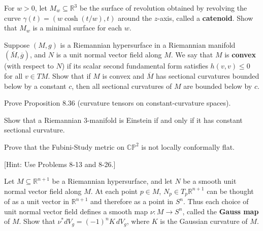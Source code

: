 \begin{exercise}
\label{prob:catenoid-minimal-surface}
For $w > 0$, let $M_w \subseteq \mathbb{R}^3$ be the surface of revolution obtained by revolving the curve $\gamma(t) = (w \cosh(t/w), t)$ around the $z$-axis, called a \textbf{catenoid}. Show that $M_w$ is a minimal surface for each $w$.
\end{exercise}

\begin{exercise}
\label{prob:convex-hypersurface}
Suppose $(M, g)$ is a Riemannian hypersurface in a Riemannian manifold $(\overline{M}, \overline{g})$, and $N$ is a unit normal vector field along $M$. We say that $M$ is \textbf{convex} (with respect to $N$) if its scalar second fundamental form satisfies $h(v, v) \leq 0$ for all $v \in TM$. Show that if $M$ is convex and $\overline{M}$ has sectional curvatures bounded below by a constant $c$, then all sectional curvatures of $M$ are bounded below by $c$.
\end{exercise}

\begin{exercise}
\label{prob:curvature-tensors-constant-curvature}
Prove Proposition 8.36 (curvature tensors on constant-curvature spaces).
\end{exercise}

\begin{exercise}
\label{prob:einstein-sectional-curvature}
Show that a Riemannian 3-manifold is Einstein if and only if it has constant sectional curvature.
\end{exercise}

\begin{exercise}
\label{prob:fubini-study-not-conformal-flat}
Prove that the Fubini-Study metric on $\mathbb{CP}^2$ is not locally conformally flat.

[Hint: Use Problems 8-13 and 8-26.]
\end{exercise}

\begin{exercise}
\label{prob:gauss-map}
Let $M \subseteq \mathbb{R}^{n+1}$ be a Riemannian hypersurface, and let $N$ be a smooth unit normal vector field along $M$. At each point $p \in M$, $N_p \in T_p \mathbb{R}^{n+1}$ can be thought of as a unit vector in $\mathbb{R}^{n+1}$ and therefore as a point in $S^n$. Thus each choice of unit normal vector field defines a smooth map $\nu : M \to S^n$, called the \textbf{Gauss map} of $M$. Show that $\nu^* dV_g = (-1)^n K \, dV_g$, where $K$ is the Gaussian curvature of $M$.
\end{exercise}

